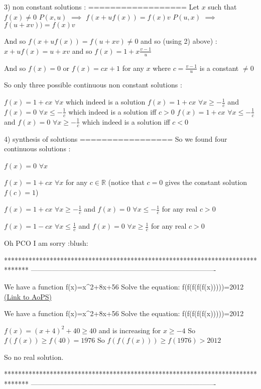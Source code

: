 \begin{solution}
3) non constant solutions :
==================
Let $x$ such that $f(x)\ne 0$
$P(x,u)$ $\implies$ $f(x+uf(x))=f(x)v$
$P(u,x)$ $\implies$ $f(u+xv))=f(x)v$

And so $f(x+uf(x))=f(u+xv)\ne 0$ and so (using 2) above) : $x+uf(x)=u+xv$ and so $f(x)=1+x\frac{v-1}u$

And so $f(x)=0$ or $f(x)=cx+1$ for any $x$ where $c=\frac{v-1}u$ is a constant $\ne 0$

So only three possible continuous non constant solutions :

$f(x)=1+cx$ $\forall x$ which indeed is a solution
$f(x)=1+cx$ $\forall x\ge -\frac 1c$ and $f(x)=0$ $\forall x\le -\frac 1c$ which indeed is a solution iff $c>0$
$f(x)=1+cx$ $\forall x\le -\frac 1c$ and $f(x)=0$ $\forall x\ge -\frac 1c$ which indeed is a solution iff $c<0$

4) synthesis of solutions
=================
So we found four continuous solutions :

$f(x)=0$ $\forall x$

$f(x)=1+cx$ $\forall x$ for any $c\in\mathbb R$ (notice that $c=0$ gives the constant solution $f(c)=1$)

$f(x)=1+cx$ $\forall x\ge -\frac 1c$ and $f(x)=0$ $\forall x\le -\frac 1c$ for any real $c>0$

$f(x)=1-cx$ $\forall x\le \frac 1c$ and $f(x)=0$ $\forall x\ge \frac 1c$ for any real $c>0$
\end{solution}



\begin{solution}
	Oh PCO I am sorry  :blush:
\end{solution}
*******************************************************************************
-------------------------------------------------------------------------------

\begin{problem}
	We have a function f(x)=x^2+8x+56
Solve the equation: f(f(f(f(f(x)))))=2012
	\flushright \href{https://artofproblemsolving.com/community/c6h468614}{(Link to AoPS)}
\end{problem}



\begin{solution}
	\begin{tcolorbox}We have a function f(x)=x^2+8x+56
Solve the equation: f(f(f(f(f(x)))))=2012\end{tcolorbox}
$f(x)=(x+4)^2+40\ge 40$ and is increasing for $x\ge -4$
So $f(f(x))\ge f(40)=1976$
So $f(f(f(x)))\ge f(1976)>2012$

So no real solution.
\end{solution}
*******************************************************************************
-------------------------------------------------------------------------------

